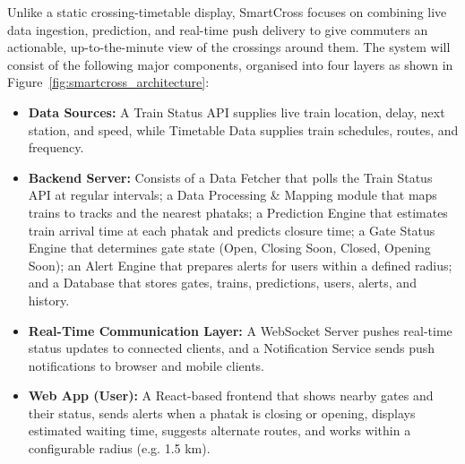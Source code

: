 \documentclass[11pt,a4paper]{article}
\begin{document}
Unlike a static crossing-timetable display, SmartCross focuses on combining live data ingestion, prediction, and real-time push delivery to give commuters an actionable, up-to-the-minute view of the crossings around them. The system will consist of the following major components, organised into four layers as shown in Figure~\ref{fig:smartcross_architecture}:

\begin{itemize}
    \item \textbf{Data Sources:} A Train Status API supplies live train location, delay, next station, and speed, while Timetable Data supplies train schedules, routes, and frequency.

    \item \textbf{Backend Server:} Consists of a Data Fetcher that polls the Train Status API at regular intervals; a Data Processing \& Mapping module that maps trains to tracks and the nearest phataks; a Prediction Engine that estimates train arrival time at each phatak and predicts closure time; a Gate Status Engine that determines gate state (Open, Closing Soon, Closed, Opening Soon); an Alert Engine that prepares alerts for users within a defined radius; and a Database that stores gates, trains, predictions, users, alerts, and history.

    \item \textbf{Real-Time Communication Layer:} A WebSocket Server pushes real-time status updates to connected clients, and a Notification Service sends push notifications to browser and mobile clients.

    \item \textbf{Web App (User):} A React-based frontend that shows nearby gates and their status, sends alerts when a phatak is closing or opening, displays estimated waiting time, suggests alternate routes, and works within a configurable radius (e.g. 1.5 km).
\end{itemize}
\end{document}

